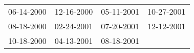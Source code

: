 \begin{supertabular}{llll}
 06-14-2000 &  12-16-2000 &  05-11-2001 &  10-27-2001 \\
 08-18-2000 &  02-24-2001 &  07-20-2001 &  12-12-2001 \\
 10-18-2000 &  04-13-2001 &  08-18-2001 &             \\
\end{supertabular}
